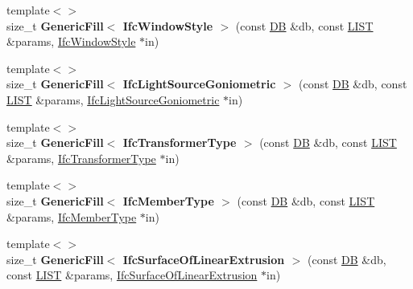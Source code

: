 \begin{DoxyCompactItemize}
\item 
\hypertarget{namespace_assimp_1_1_s_t_e_p_a0b76a38bb68676b331ca8c95ea474221}{{\footnotesize template$<$$>$ }\\size\+\_\+t {\bfseries Generic\+Fill$<$ Ifc\+Window\+Style $>$} (const \hyperlink{class_assimp_1_1_s_t_e_p_1_1_d_b}{D\+B} \&db, const \hyperlink{class_assimp_1_1_s_t_e_p_1_1_e_x_p_r_e_s_s_1_1_l_i_s_t}{L\+I\+S\+T} \&params, \hyperlink{struct_assimp_1_1_i_f_c_1_1_ifc_window_style}{Ifc\+Window\+Style} $\ast$in)}\label{namespace_assimp_1_1_s_t_e_p_a0b76a38bb68676b331ca8c95ea474221}

\item 
\hypertarget{namespace_assimp_1_1_s_t_e_p_a0d87b64c66ea6abb8bb8919356e68882}{{\footnotesize template$<$$>$ }\\size\+\_\+t {\bfseries Generic\+Fill$<$ Ifc\+Light\+Source\+Goniometric $>$} (const \hyperlink{class_assimp_1_1_s_t_e_p_1_1_d_b}{D\+B} \&db, const \hyperlink{class_assimp_1_1_s_t_e_p_1_1_e_x_p_r_e_s_s_1_1_l_i_s_t}{L\+I\+S\+T} \&params, \hyperlink{struct_assimp_1_1_i_f_c_1_1_ifc_light_source_goniometric}{Ifc\+Light\+Source\+Goniometric} $\ast$in)}\label{namespace_assimp_1_1_s_t_e_p_a0d87b64c66ea6abb8bb8919356e68882}

\item 
\hypertarget{namespace_assimp_1_1_s_t_e_p_a87464cfde3a0298468193d08108c65b1}{{\footnotesize template$<$$>$ }\\size\+\_\+t {\bfseries Generic\+Fill$<$ Ifc\+Transformer\+Type $>$} (const \hyperlink{class_assimp_1_1_s_t_e_p_1_1_d_b}{D\+B} \&db, const \hyperlink{class_assimp_1_1_s_t_e_p_1_1_e_x_p_r_e_s_s_1_1_l_i_s_t}{L\+I\+S\+T} \&params, \hyperlink{struct_assimp_1_1_i_f_c_1_1_ifc_transformer_type}{Ifc\+Transformer\+Type} $\ast$in)}\label{namespace_assimp_1_1_s_t_e_p_a87464cfde3a0298468193d08108c65b1}

\item 
\hypertarget{namespace_assimp_1_1_s_t_e_p_a4f40857a6ea2c3b286f716b4d9a74283}{{\footnotesize template$<$$>$ }\\size\+\_\+t {\bfseries Generic\+Fill$<$ Ifc\+Member\+Type $>$} (const \hyperlink{class_assimp_1_1_s_t_e_p_1_1_d_b}{D\+B} \&db, const \hyperlink{class_assimp_1_1_s_t_e_p_1_1_e_x_p_r_e_s_s_1_1_l_i_s_t}{L\+I\+S\+T} \&params, \hyperlink{struct_assimp_1_1_i_f_c_1_1_ifc_member_type}{Ifc\+Member\+Type} $\ast$in)}\label{namespace_assimp_1_1_s_t_e_p_a4f40857a6ea2c3b286f716b4d9a74283}

\item 
\hypertarget{namespace_assimp_1_1_s_t_e_p_aee1ddf44be8023aaa22f312e078a3923}{{\footnotesize template$<$$>$ }\\size\+\_\+t {\bfseries Generic\+Fill$<$ Ifc\+Surface\+Of\+Linear\+Extrusion $>$} (const \hyperlink{class_assimp_1_1_s_t_e_p_1_1_d_b}{D\+B} \&db, const \hyperlink{class_assimp_1_1_s_t_e_p_1_1_e_x_p_r_e_s_s_1_1_l_i_s_t}{L\+I\+S\+T} \&params, \hyperlink{struct_assimp_1_1_i_f_c_1_1_ifc_surface_of_linear_extrusion}{Ifc\+Surface\+Of\+Linear\+Extrusion} $\ast$in)}\label{namespace_assimp_1_1_s_t_e_p_aee1ddf44be8023aaa22f312e078a3923}


\end{DoxyCompactItemize}
